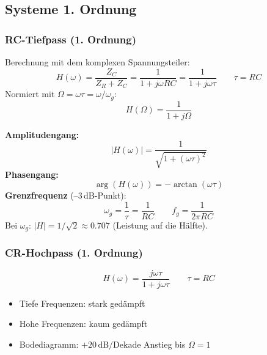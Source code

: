 \documentclass[a4paper,12pt]{article}
\begin{document}
	\subsection{Systeme 1. Ordnung}
	
	\subsubsection{RC-Tiefpass (1. Ordnung)}
	
	
	Berechnung mit dem komplexen Spannungsteiler:
	\begin{equation}
		H(\omega) = \frac{Z_C}{Z_R + Z_C} = \frac{1}{1 + j\omega RC} = \frac{1}{1+j\omega\tau}
		\qquad \tau = RC
	\end{equation}
	Normiert mit $\Omega = \omega\tau = \omega/\omega_g$:
	\begin{equation}
		H(\Omega) = \frac{1}{1+j\Omega}
	\end{equation}
	
	\textbf{Amplitudengang:}
	\begin{equation}
		|H(\omega)| = \frac{1}{\sqrt{1+(\omega\tau)^2}}
	\end{equation}
	\textbf{Phasengang:}
	\begin{equation}
		\arg(H(\omega)) = -\arctan(\omega\tau)
	\end{equation}
	\textbf{Grenzfrequenz} (--3\,dB-Punkt):
	\begin{equation}
		\omega_g = \frac{1}{\tau} = \frac{1}{RC} \qquad f_g = \frac{1}{2\pi RC}
	\end{equation}
	Bei $\omega_g$: $|H| = 1/\sqrt{2} \approx 0.707$ (Leistung auf die Hälfte).
	
	
	\subsubsection{CR-Hochpass (1. Ordnung)}
	
	
	\begin{equation}
		H(\omega) = \frac{j\omega\tau}{1+j\omega\tau} \qquad \tau = RC
	\end{equation}
	\begin{itemize}
		\item Tiefe Frequenzen: stark gedämpft
		\item Hohe Frequenzen: kaum gedämpft
		\item Bodediagramm: $+20\,\text{dB/Dekade}$ Anstieg bis $\Omega=1$
	\end{itemize}
	
\end{document}
